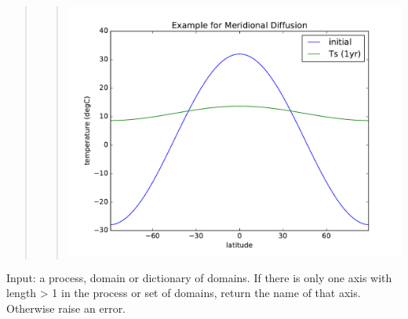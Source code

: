 \documentclass[letterpaper,10pt,english]{sphinxmanual}
\begin{document}
\begin{fulllineitems}
\begin{quote}
\begin{quote}
\begin{description}
\includegraphics{meridional_diffusion_example.pdf}

\end{description}\end{quote}
\end{quote}

\end{fulllineitems}


\begin{fulllineitems}
\label{api/climlab.dynamics:climlab.dynamics.diffusion._guess_diffusion_axis}
Input: a process, domain or dictionary of domains.
If there is only one axis with length \textgreater{} 1 in the process or
set of domains, return the name of that axis.
Otherwise raise an error.

\end{fulllineitems}

\end{document}

